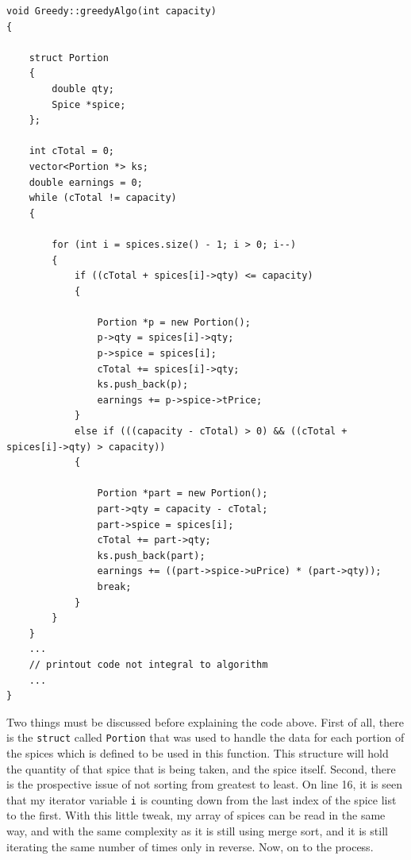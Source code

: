 \documentclass[letterpaper, 10pt]{article}
\begin{document}
 \begin{addmargin}[-5em]{1em}
\begin{small}
\begin{verbatim}
void Greedy::greedyAlgo(int capacity)
{

    struct Portion
    {
        double qty;
        Spice *spice;
    };

    int cTotal = 0;
    vector<Portion *> ks;
    double earnings = 0;
    while (cTotal != capacity)
    {
        
        for (int i = spices.size() - 1; i > 0; i--)
        {
            if ((cTotal + spices[i]->qty) <= capacity)
            {

                Portion *p = new Portion();
                p->qty = spices[i]->qty;
                p->spice = spices[i];
                cTotal += spices[i]->qty;
                ks.push_back(p);
                earnings += p->spice->tPrice;
            }
            else if (((capacity - cTotal) > 0) && ((cTotal + spices[i]->qty) > capacity))
            {

                Portion *part = new Portion();
                part->qty = capacity - cTotal;
                part->spice = spices[i];
                cTotal += part->qty;
                ks.push_back(part);
                earnings += ((part->spice->uPrice) * (part->qty));
                break;
            }
        }
    }
    ...
    // printout code not integral to algorithm
    ...
}
\end{verbatim}
\end{small}
\end{addmargin}   

Two things must be discussed before explaining the code above. First of all, there is the \texttt{struct} called \texttt{Portion} that was used to handle the data for each portion of the spices which is defined to be used in this function. This structure will hold the quantity of that spice that is being taken, and the spice itself. Second, there is the prospective issue of not sorting from greatest to least. On line 16, it is seen that my iterator variable \texttt{i} is counting down from the last index of the spice list to the first. With this little tweak, my array of spices can be read in the same way, and with the same complexity as it is still using merge sort, and it is still iterating the same number of times only in reverse. Now, on to the process. 
\end{document}
